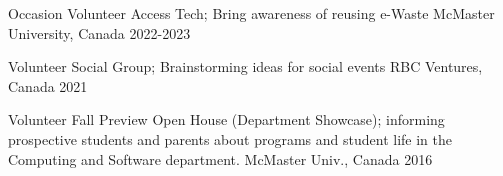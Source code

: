 

\begin{cvhonors}


\cvhonor
{Occasion Volunteer} %
{Access Tech; Bring awareness of reusing e-Waste} %
{McMaster University, Canada} %
{2022-2023} %

\cvhonor
{Volunteer} %
{Social Group; Brainstorming ideas for social events} %
{RBC Ventures, Canada} %
{2021} %



  \cvhonor
    {Volunteer} %
    {Fall Preview Open House (Department Showcase); informing prospective students and parents about programs and student life in the Computing and Software department.} %
    {McMaster Univ., Canada} %
    {2016} %
    
\end{cvhonors}
